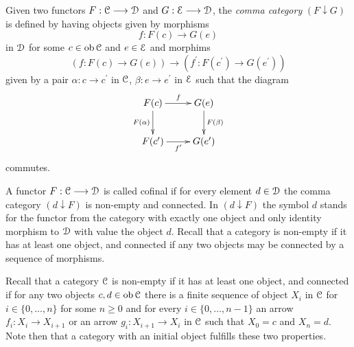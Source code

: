     \begin{defn}\label{def_comma_category}
      Given two functors $F:\mathcal{C} \longrightarrow \mathcal{D}$ and $G: \mathcal{E} \longrightarrow \mathcal{D}$, the \emph{comma category} $(F \downarrow G)$ is defined by having objects given by morphisms 
      \begin{displaymath}
        f \colon F(c) \to G(e)
      \end{displaymath}
      in $\mathcal{D}$ for some $c \in \operatorname{ob} \mathcal{C}$ and $e \in \mathcal{E}$ and morphims 
      \begin{displaymath}
        (f \colon F(c) \to G(e)) \to (f^\prime \colon F(c^\prime) \to G(e^\prime) )
      \end{displaymath}
      given by a pair $\alpha \colon c \to c^\prime$ in $\mathcal{C}$, $\beta \colon e \to e^\prime$ in $\mathcal{E}$ such that the diagram
      \begin{displaymath}
          \xymatrix{
            F(c)
              \ar[r]^{f}
              \ar[d]_{F(\alpha)}
            &
            G(e)
              \ar[d]^{F(\beta)}
            \\
            F(c^\prime) 
              \ar[r]_{f^\prime}
            &
            G(e^\prime)
          }
      \end{displaymath}
      commutes.
    \end{defn}

    \begin{defn}\label{def_cofinal}
      A functor $F: \mathcal{C} \longrightarrow \mathcal{D}$ is called cofinal if for every element $d \in \mathcal{D}$ the comma category $(d \downarrow F)$ is non-empty and connected. In $(d \downarrow F)$ the symbol $d$ stands for the functor from the category with exactly one object and only identity morphism to $\mathcal{D}$ with value the object $d$. Recall that a category is non-empty if it has at least one object, and connected if any two objects may be connected by a sequence of morphisms.
    \end{defn}

    \begin{rem}\label{rem_functor_cofinal_if_comma_categories_have_initial_object}
      Recall that a category $\mathcal{C}$ is non-empty if it has at least one object, and connected if for any two objects $c,d \in \operatorname{ob} \mathcal{C}$ there is a finite sequence of object $X_i$ in $\mathcal{C}$ for $i \in \{0, \ldots, n\}$ for some $n \geq 0$ and for every $i \in \{0, \ldots, n-1\}$ an arrow $f_i \colon X_i \to X_{i+1}$ or an arrow $g_i \colon X_{i+1} \to X_i$ in $\mathcal{C}$ such that $X_0 = c$ and $X_n = d$. Note then that a category with an initial object fulfills these two properties.
    \end{rem}

